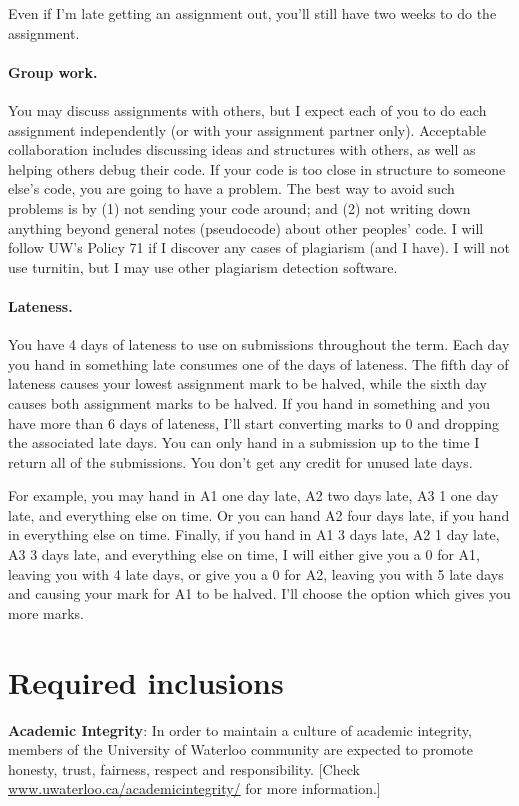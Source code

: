 \documentclass{article}
\begin{document}
\noindent Even if I'm late getting an assignment out, you'll still have two weeks to do the assignment. 

\paragraph{Group work.} 
You may discuss assignments with others, but I expect each of you to
do each assignment independently (or with your assignment partner only). Acceptable collaboration includes
discussing ideas and structures with others, as well as helping others
debug their code. If your code is too close in structure to someone
else's code, you are going to have a problem. The best way to avoid
such problems is by (1) not sending your code around; and (2) not
writing down anything beyond general notes (pseudocode) about other
peoples' code. I will follow UW's Policy 71 if I discover any cases of
plagiarism (and I have). I will not use turnitin, but I may use other
plagiarism detection software.

\paragraph{Lateness.} You have 4 days of lateness to use on 
submissions throughout the term. Each day you hand in something late
consumes one of the days of lateness. The fifth day of lateness causes
your lowest assignment mark to be halved, while the sixth day causes
both assignment marks to be halved. If you hand in something and you
have more than 6 days of lateness, I'll start converting marks to 0
and dropping the associated late days. You can only hand in a
submission up to the time I return all of the submissions. You don't
get any credit for unused late days.

For example, you may hand in A1 one day late, A2 two days late, A3 1
one day late, and everything else on time.  Or you can hand A2 four
days late, if you hand in everything else on time. Finally, if you
hand in A1 3 days late, A2 1 day late, A3 3 days late, and
everything else on time, I will either give you a 0 for A1, leaving you
with 4 late days, or give you a 0 for A2, leaving you with 5 late days
and causing your mark for A1 to be halved. I'll choose the option
which gives you more marks.

\newpage
\section*{Required inclusions}
{\bf Academic Integrity}: In order to maintain a culture of academic
integrity, members of the University of Waterloo community are
expected to promote honesty, trust, fairness, respect and
responsibility. [Check \url{www.uwaterloo.ca/academicintegrity/} for more
  information.]
\end{document}
